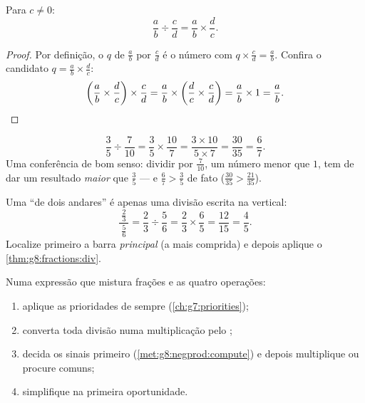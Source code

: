 \begin{theorem}\label{thm:g8:fractions:div}
Para $c \neq 0$:
\[
\frac{a}{b} \div \frac{c}{d} = \frac{a}{b} \times \frac{d}{c} .
\]
\end{theorem}

\begin{proof}
Por definição, o  $q$ de $\frac ab$ por $\frac cd$ é o número
com $q \times \frac cd = \frac ab$. Confira o candidato
$q = \frac ab \times \frac dc$:
\[
\left(\frac ab \times \frac dc\right) \times \frac cd
= \frac ab \times \left(\frac dc \times \frac cd\right)
= \frac ab \times 1 = \frac ab . \qedhere
\]
\end{proof}

\begin{example}\label{ex:g8:fractions:div}
\[
\frac{3}{5} \div \frac{7}{10}
= \frac{3}{5} \times \frac{10}{7}
= \frac{3 \times 10}{5 \times 7}
= \frac{30}{35} = \frac{6}{7}.
\]
Uma conferência de bom senso: dividir por $\frac{7}{10}$, um número
menor que $1$, tem de dar um resultado \emph{maior} que $\frac35$ ---
e $\frac67 > \frac35$ de fato ($\frac{30}{35} > \frac{21}{35}$).
\end{example}

\begin{example}\label{ex:g8:fractions:complex}
Uma  ``de dois andares'' é apenas uma divisão escrita na
vertical:
\[
\frac{\ \frac{2}{3}\ }{\ \frac{5}{6}\ }
= \frac{2}{3} \div \frac{5}{6}
= \frac{2}{3} \times \frac{6}{5}
= \frac{12}{15} = \frac{4}{5}.
\]
Localize primeiro a barra \emph{principal} (a mais comprida) e depois
aplique o \cref{thm:g8:fractions:div}.
\end{example}

\begin{method}\label{met:g8:fractions:mixed}
Numa expressão que mistura frações e as quatro operações:
\begin{enumerate}
  \item aplique as prioridades de sempre (\cref{ch:g7:priorities});
  \item converta toda divisão numa multiplicação pelo ;
  \item decida os sinais primeiro (\cref{met:g8:negprod:compute}) e
        depois multiplique ou procure  comuns;
  \item simplifique na primeira oportunidade.
\end{enumerate}
\end{method}

